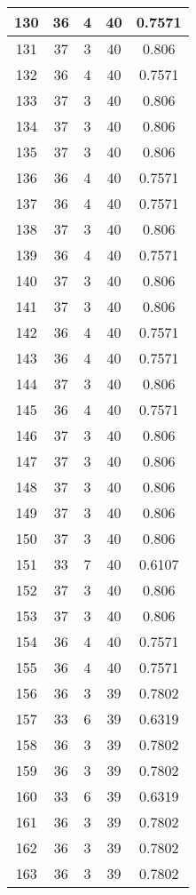 \documentclass[letterpaper, 12pt]{article}
\begin{document}
\begin{longtable}{|c|c|c|c|c|}
\hline
130 & 36 & 4 & 40 & 0.7571 \\
\hline
131 & 37 & 3 & 40 & 0.806 \\
\hline
132 & 36 & 4 & 40 & 0.7571 \\
\hline
133 & 37 & 3 & 40 & 0.806 \\
\hline
134 & 37 & 3 & 40 & 0.806 \\
\hline
135 & 37 & 3 & 40 & 0.806 \\
\hline
136 & 36 & 4 & 40 & 0.7571 \\
\hline
137 & 36 & 4 & 40 & 0.7571 \\
\hline
138 & 37 & 3 & 40 & 0.806 \\
\hline
139 & 36 & 4 & 40 & 0.7571 \\
\hline
140 & 37 & 3 & 40 & 0.806 \\
\hline
141 & 37 & 3 & 40 & 0.806 \\
\hline
142 & 36 & 4 & 40 & 0.7571 \\
\hline
143 & 36 & 4 & 40 & 0.7571 \\
\hline
144 & 37 & 3 & 40 & 0.806 \\
\hline
145 & 36 & 4 & 40 & 0.7571 \\
\hline
146 & 37 & 3 & 40 & 0.806 \\
\hline
147 & 37 & 3 & 40 & 0.806 \\
\hline
148 & 37 & 3 & 40 & 0.806 \\
\hline
149 & 37 & 3 & 40 & 0.806 \\
\hline
150 & 37 & 3 & 40 & 0.806 \\
\hline
151 & 33 & 7 & 40 & 0.6107 \\
\hline
152 & 37 & 3 & 40 & 0.806 \\
\hline
153 & 37 & 3 & 40 & 0.806 \\
\hline
154 & 36 & 4 & 40 & 0.7571 \\
\hline
155 & 36 & 4 & 40 & 0.7571 \\
\hline
156 & 36 & 3 & 39 & 0.7802 \\
\hline
157 & 33 & 6 & 39 & 0.6319 \\
\hline
158 & 36 & 3 & 39 & 0.7802 \\
\hline
159 & 36 & 3 & 39 & 0.7802 \\
\hline
160 & 33 & 6 & 39 & 0.6319 \\
\hline
161 & 36 & 3 & 39 & 0.7802 \\
\hline
162 & 36 & 3 & 39 & 0.7802 \\
\hline
163 & 36 & 3 & 39 & 0.7802 \\

\end{longtable}
\end{document}
